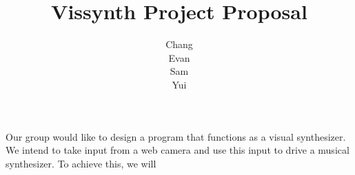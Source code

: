 \documentclass{article}
\title{Vissynth Project Proposal}
\author{Chang \\ Evan \\ Sam \\ Yui}
\begin{document}
\maketitle

Our group would like to design a program that functions as a visual synthesizer. We intend to take input from a web camera and use this input to drive a musical synthesizer. To achieve this, we will 
\end{document}
